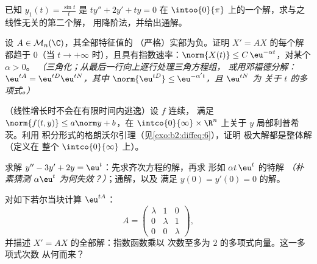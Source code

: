 \begin{exercise}[$\star\star$]\label{exo:b2:diffeq:7}
已知 $y_1(t) = \frac{\sin t}{t}$ 是 $ty'' + 2y' + ty =
0$ 在 $\intoo{0}{\pi}$ 上的一个解，求与之线性无关的第二个解，
用降阶法，并给出通解。
\end{exercise}

\begin{exercise}[$\star\star\star$]\label{exo:b2:diffeq:8}
设 $A \in \mathcal{M}_n(\C)$，其全部特征值的
（严格）实部为负。证明 $X' = AX$ 的每个解都趋于
$0$（当 $t \to +\infty$ 时），且具有指数速率：$\norm{X(t)}
\leq C\,\eu^{-\alpha t}$，对某个 $\alpha > 0$。
\emph{（三角化；从最后一行向上逐行处理三角方程组，
或用邓福德分解：$\eu^{tA} = \eu^{tD}\eu^{tN}$，其中
$\norm{\eu^{tD}} \leq \eu^{-\alpha' t}$，且 $\eu^{tN}$ 为
关于 $t$ 的多项式。）}
\end{exercise}

\begin{exercise}[$\star\star\star$]\label{exo:b2:diffeq:9}
（线性增长时不会在有限时间内逃逸）设 $f$ 连续，
满足 $\norm{f(t, y)} \leq a\norm y + b$，在
$\intco{0}{\infty} \times \R^n$ 上关于 $y$ 局部利普希茨。利用
积分形式的格朗沃尔引理（见\cref{exo:b2:diffeq:6}），证明
极大解都是整体解（定义在
整个 $\intco{0}{\infty}$ 上）。
\end{exercise}

\begin{exercise}[$\star$]\label{exo:b2:diffeq:10}
求解 $y'' - 3y' + 2y = \eu^{t}$：先求齐次方程的解，再求
形如 $\alpha t\,\eu^{t}$ 的特解 \emph{（朴素猜测
$\alpha\eu^t$ 为何失效？）}；通解，以及
满足 $y(0) = y'(0) = 0$ 的解。
\end{exercise}

\begin{exercise}[$\star\star$]\label{exo:b2:diffeq:11}
对如下若尔当块计算 $\eu^{tA}$：
\[
A = \begin{pmatrix} \lambda & 1 & 0\\ 0 & \lambda & 1\\
0 & 0 & \lambda\end{pmatrix},
\]
并描述 $X' = AX$ 的全部解：指数函数乘以
次数至多为 $2$ 的多项式向量。这一多项式次数
从何而来？
\end{exercise}

